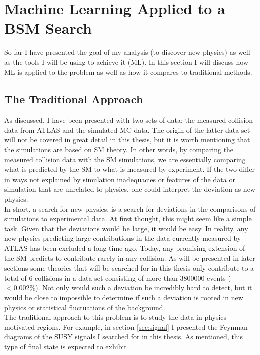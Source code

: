 \section{Machine Learning Applied to a BSM Search}\label{sec:MLHEP}
So far I have presented the goal of my analysis (to discover new physics)
as well as the tools I will be using to achieve it (\ac{ML}). In this section
I will discuss how \ac{ML} is applied to the problem as well as how it compares
to traditional methods.
\subsection{The Traditional Approach}
As discussed, I have been presented with two sets of data; the measured collision 
data from \ac{ATLAS} and the simulated \ac{MC} data. The origin of the latter data set 
will not be covered in great detail in this thesis, but it is worth mentioning that 
the simulations are based on \ac{SM} theory. In other words, by comparing the measured collision 
data with the \ac{SM} simulations, we are essentially comparing what is predicted by the \ac{SM} 
to what is measured by experiment. If the two differ in ways not explained by simulation inadequacies 
or features of the data or simulation that are unrelated to physics, one could interpret the deviation 
as new physics.
\\
In short, a search for new physics, is a search for deviations in the comparisons of simulations 
to experimental data. At first thought, this might seem like a simple task. Given that the deviations 
would be large, it would be easy. In reality, any new physics predicting large contributions 
in the data currently measured by \ac{ATLAS} has been excluded a long time ago. Today, any
promising extension of the \ac{SM} predicts to contribute rarely in any collision. As will 
be presented in later sections some theories that will be searched for in this thesis only 
contribute to a total of 6 collisions in a data set consisting of more than $3800000$ events 
($<0.002\%$). Not only would such a deviation be incredibly hard to detect, but it would 
be close to impossible to determine if such a deviation is rooted in new physics or statistical fluctuations 
of the background. 
\\
The traditional approach to this problem is to study the data in physics motivated regions. 
For example, in section \ref{sec:signal} I presented the Feynman diagrams of the \ac{SUSY} signals I 
searched for in this thesis. As mentioned, this type of final state is expected to exhibit 
